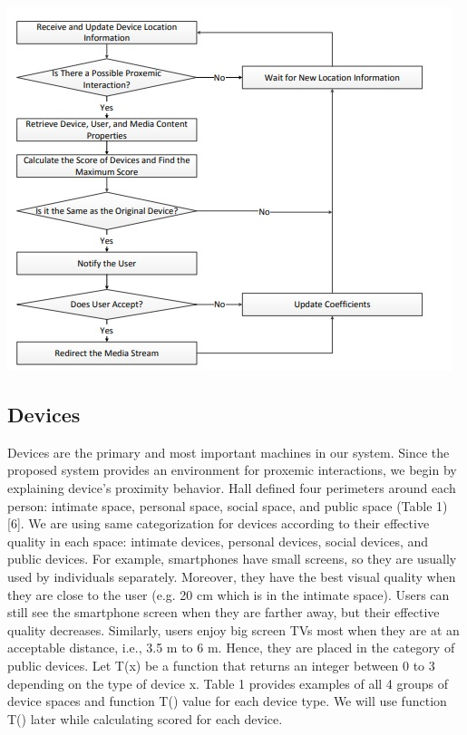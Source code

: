 \documentclass[runningheads,a4paper]{llncs}
\begin{document}
\includegraphics[]{fig1.jpg}

\subsection{Devices}

Devices are the primary and most important machines in our system. Since the proposed system provides an environment for proxemic interactions, we begin by
explaining device’s proximity behavior. Hall defined four perimeters around each
person: intimate space, personal space, social space, and public space (Table 1)
[6]. We are using same categorization for devices according to their effective quality in each space: intimate devices, personal devices, social devices, and public
devices. For example, smartphones have small screens, so they are usually used
by individuals separately. Moreover, they have the best visual quality when they
are close to the user (e.g. 20 cm which is in the intimate space). Users can still
see the smartphone screen when they are farther away, but their effective quality decreases. Similarly, users enjoy big screen TVs most when they are at an
acceptable distance, i.e., 3.5 m to 6 m. Hence, they are placed in the category
of public devices. Let T(x) be a function that returns an integer between 0 to 3
depending on the type of device x. Table 1 provides examples of all 4 groups of
device spaces and function T() value for each device type. We will use function
T() later while calculating scored for each device.
\end{document}
